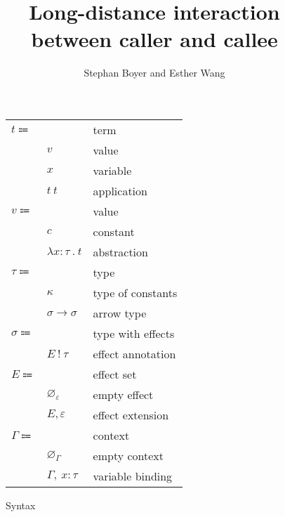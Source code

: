 \documentclass[12pt]{article}
\title{Long-distance interaction \\ between caller and callee}
\author{Stephan Boyer and Esther Wang}
\date{}
\newcommand\eterm{t}
\newcommand\evalue{v}
\newcommand\econst{c}
\newcommand\evar{x}
\newcommand\eabs[2]{\lambda #1 \ . \ #2}
\newcommand\eapp[2]{#1 \ #2}
\newcommand\ttype{\tau}
\newcommand\tconst{\kappa}
\newcommand\tarrow[2]{#1 \rightarrow #2}
\newcommand\tanno[2]{#1 : #2}
\newcommand\twithx{\sigma}
\newcommand\tx[2]{#1 \ ! \ #2}
\newcommand\xeffect{\varepsilon}
\newcommand\xeffects{E}
\newcommand\xempty{\varnothing_{\xeffect}}
\newcommand\xextend[2]{#1, #2}
\newcommand\ccontext{\Gamma}
\newcommand\cempty{\varnothing_{\ccontext}}
\newcommand\cextend[3]{#1, \ \tanno{#2}{#3}}
\begin{document}
  \maketitle

  \begin{figure}
    \begin{mdframed}
      \begin{center}
        \begin{tabular}{l l l}
          $\eterm \Coloneqq $ & & term \\
          & $\evalue$ & value \\
          & $\evar$ & variable \\
          & $\eapp{\eterm}{\eterm}$ & application \\
          $\evalue \Coloneqq $ & & value \\
          & $\econst$ & constant \\
          & $\eabs{\tanno{\evar}{\ttype}}{\eterm}$ & abstraction \\
          $\ttype \Coloneqq$ & & type \\
          & $\tconst$ & type of constants \\
          & $\tarrow{\twithx}{\twithx}$ & arrow type \\
          $\twithx \Coloneqq$ & & type with effects \\
          & $\tx{\xeffects}{\ttype}$ & effect annotation \\
          $\xeffects \Coloneqq$ & & effect set \\
          & $\xempty$ & empty effect \\
          & $\xextend{\xeffects}{\xeffect}$ & effect extension \\
          $\ccontext \Coloneqq$ & & context \\
          & $\cempty$ & empty context \\
          & $\cextend{\ccontext}{\evar}{\ttype}$ & variable binding \\
        \end{tabular}
      \end{center}

      \caption{Syntax}
      \label{fig:syntax}
    \end{mdframed}
  \end{figure}
\end{document}
